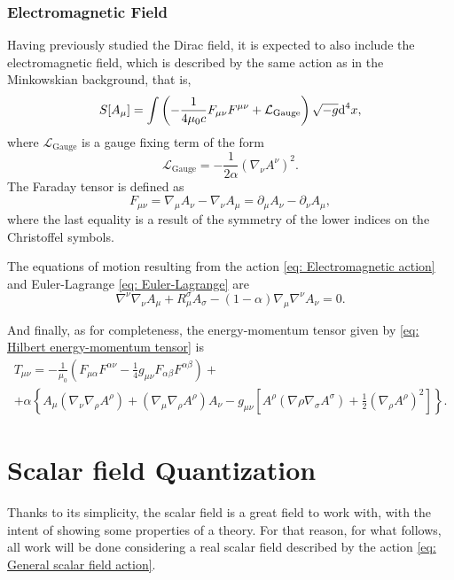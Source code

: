 \subsubsection{Electromagnetic Field}
Having previously studied the Dirac field, it is expected to also include the electromagnetic field, which is described by the same action as in the Minkowskian background, that is,
\begin{equation}\label{eq: Electromagnetic action}
	S[A_\mu]=\int\left(-\frac{1}{4\mu_0 c}F_{\mu\nu}F^{\mu\nu}+\mathcal{L}_{\text{Gauge}}\right)\sqrt{-g}\text{d}^4x,
\end{equation}
where $\mathcal{L}_{\text{Gauge}}$ is a gauge fixing term of the form
\begin{equation}
	\mathcal{L}_{\text{Gauge}}=-\frac{1}{2\alpha}\left(\nabla_\nu A^\nu\right)^2.
\end{equation}
The Faraday tensor is defined as
\begin{equation}
	F_{\mu\nu}=\nabla_\mu A_\nu-\nabla_\nu A_\mu=\partial_\mu A_\nu-\partial_\nu A_\mu,
\end{equation}
where the last equality is a result of the symmetry of the lower indices on the Christoffel symbols.


The equations of motion resulting from the action \ref{eq: Electromagnetic action} and Euler-Lagrange \ref{eq: Euler-Lagrange} are
\begin{equation}
	\nabla^\nu\nabla_\nu A_\mu+R_\mu^\sigma A_\sigma-\left(1-\alpha\right)\nabla_\mu\nabla^\nu A_\nu=0.
\end{equation}

And finally, as for completeness, the energy-momentum tensor \cite[sec.\,3.8]{BirrelDavies} given by \ref{eq: Hilbert energy-momentum tensor} is
\begin{multline}
	T_{\mu\nu}=-\frac{1}{\mu_0}\left(F_{\mu\alpha}F^{\alpha\nu}-\frac{1}{4}g_{\mu\nu}F_{\alpha\beta}F^{\alpha\beta}\right)+\\
	+\alpha\left\{A_\mu\left(\nabla_\nu\nabla_\rho A^\rho\right)+\left(\nabla_\mu\nabla_\rho A^\rho\right)A_\nu-g_{\mu\nu}\left[A^\rho\left(\nabla\rho\nabla_\sigma A^\sigma\right)+\frac{1}{2}\left(\nabla_\rho A^\rho\right)^2\right]\right\}.
\end{multline}
\section{Scalar field Quantization}
Thanks to its simplicity, the scalar field is a great field to work with, with the intent of showing some properties of a theory. For that reason, for what follows, all work will be done considering a real scalar field described by the action \ref{eq: General scalar field action}.

